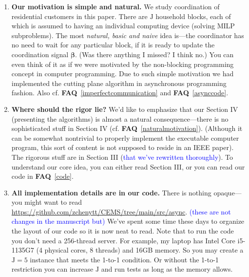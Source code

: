 \documentclass[11pt]{article}
\newcommand{\faq}[1]{\textbf{FAQ}~\ref{#1}}
\newcommand{\blue}[1]{\textcolor{blue}{#1}}
\begin{document}
\begin{enumerate}
    As such, we have no plan to continue along this track.
    \par
    By the way, we'd like to point out that our algorithm exhibits numerical stability
    in our experiments, or say `numerical robustness' which should be of
    identical meanings. This, however, is a different concept (mentioned in R1-\ref{R1robust}).
    \blue{We've modified our wording to `numerical stability'.}
    \item \textbf{Our motivation is simple and natural.} \label{naturalmotivation}
    We study coordination of residential customers in this paper.
    There are $\mathrm{J}$ household blocks, each of which is assumed to having
    an individual computing device (solving MILP subproblems).
    The most \textit{natural, basic and naive} idea is---the coordinator has no need to
    wait for any particular block, if it is ready to update
    the coordination signal $\boldsymbol{\beta}$.
    (Was there anything I missed? I think no.)
    You can even think of it as if we were motivated by the non-blocking programming
    concept in computer programming.
    Due to such simple motivation we had implemented the cutting plane algorithm in asynchronous
    programming fashion.
    Also cf. \faq{imperfectcommunication} and \faq{asynccode}.
    \item \textbf{Where should the rigor lie?} \label{algovstheory}
    We'd like to emphasize that our Section IV (presenting the algorithms) is almost
    a natural consequence---there is no sophisticated stuff in Section IV (cf. \faq{naturalmotivation}).
    (Although it can be somewhat nontrivial to properly implement the executable computer program,
    this sort of content is not supposed to reside in an IEEE paper).
    The rigorous stuff are in Section III (\blue{that we've rewritten thoroughly}).
    To understand our core idea, you can either read Section III, or you can read our code in \faq{code}.
    \item \textbf{All implementation details are in our code.} \label{code}
    There is nothing opaque---you might want to read \url{https://github.com/zchenytt/CEMS/tree/main/src/async}.
    \blue{(these are not changes in the manuscript but)} We've spent some time these days to organize the layout of our code so it is now neat to read.
    Note that to run the code you don't need a 256-thread server.
    For example, my laptop has Intel Core i5-1135G7 (4 physical cores, 8 threads) and 16GB memory.
    So you may create a $\mathrm{J}=5$ instance that meets the 1-to-1 condition.
    Or without the 1-to-1 restriction you can increase $\mathrm{J}$ and run tests as long as the memory allows.

\end{enumerate}
\end{document}
